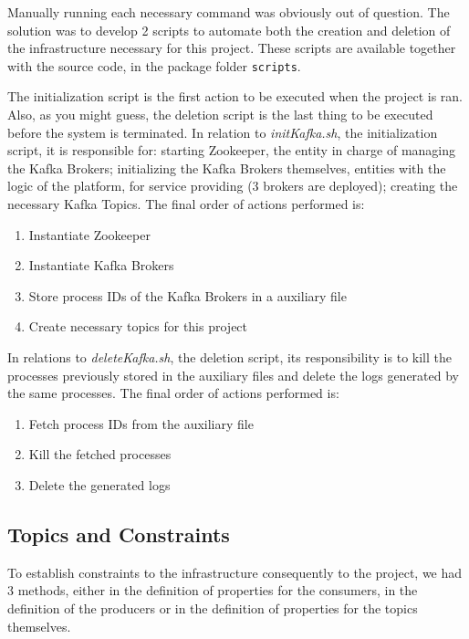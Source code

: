 \documentclass[12pt]{article}
\begin{document}
Manually running each necessary command was obviously out of question.
The solution was to develop 2 scripts to automate both the creation and deletion of the infrastructure necessary for this project. 
These scripts are available together with the source code, in the package folder \texttt{scripts}.

The initialization script is the first action to be executed when the project is ran.
Also, as you might guess, the deletion script is the last thing to be executed before the system is terminated.
In relation to \textit{initKafka.sh}, the initialization script, it is responsible for: starting Zookeeper, the entity in charge of managing the Kafka Brokers;
initializing the Kafka Brokers themselves, entities with the logic of the platform, for service providing (3 brokers are deployed); creating the necessary Kafka Topics.
The final order of actions performed is:
\vspace{-10pt}
\begin{enumerate} [noitemsep]
  \item Instantiate Zookeeper
  \item Instantiate Kafka Brokers
  \item Store process IDs of the Kafka Brokers in a auxiliary file
  \item Create necessary topics for this project
\end{enumerate}
\vspace{-10pt}
In relations to \textit{deleteKafka.sh}, the deletion script, its responsibility is to kill the processes previously stored in the auxiliary files and delete 
the logs generated by the same processes.
The final order of actions performed is:
\vspace{-10pt}
\begin{enumerate} [noitemsep]
  \item Fetch process IDs from the auxiliary file
  \item Kill the fetched processes
  \item Delete the generated logs
\end{enumerate}
\vspace{-10pt}

\subsection{Topics and Constraints} \label{topics} %
To establish constraints to the infrastructure consequently to the project, we had 3 methods, either in the definition of properties for the consumers, in the definition of the producers or in the definition of properties for the topics themselves.
\end{document}
